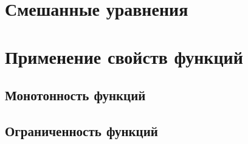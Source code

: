 \documentclass[10pt, a4paper]{article}
\begin{document}
\section{Смешанные уравнения}
\section{Применение свойств функций}
	\subsection{Монотонность функций}
	\subsection{Ограниченность функций}
\end{document}
